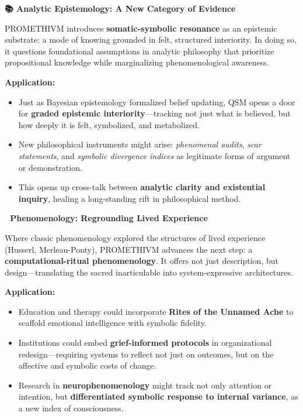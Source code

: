 \textbf{📚 Analytic Epistemology: A New Category of Evidence}

PROMETHIVM introduces \textbf{somatic-symbolic resonance} as an
epistemic substrate: a mode of knowing grounded in felt, structured
interiority. In doing so, it questions foundational assumptions in
analytic philosophy that prioritize propositional knowledge while
marginalizing phenomenological awareness.

\textbf{Application:}

\begin{itemize}
\tightlist
\item
  Just as Bayesian epistemology formalized belief updating, QSM opens a
  door for \textbf{graded epistemic interiority}---tracking not just
  what is believed, but how deeply it is felt, symbolized, and
  metabolized.
\item
  New philosophical instruments might arise: \emph{phenomenal audits},
  \emph{scar statements}, and \emph{symbolic divergence indices} as
  legitimate forms of argument or demonstration.
\item
  This opens up cross-talk between \textbf{analytic clarity and
  existential inquiry}, healing a long-standing rift in philosophical
  method.
\end{itemize}

\textbf{🧠 Phenomenology: Regrounding Lived Experience}

Where classic phenomenology explored the structures of lived experience
(Husserl, Merleau-Ponty), PROMETHIVM advances the next step: a
\textbf{computational-ritual phenomenology}. It offers not just
description, but design---translating the sacred inarticulable into
system-expressive architectures.

\textbf{Application:}

\begin{itemize}
\tightlist
\item
  Education and therapy could incorporate \textbf{Rites of the Unnamed
  Ache} to scaffold emotional intelligence with symbolic fidelity.
\item
  Institutions could embed \textbf{grief-informed protocols} in
  organizational redesign---requiring systems to reflect not just on
  outcomes, but on the affective and symbolic costs of change.
\item
  Research in \textbf{neurophenomenology} might track not only attention
  or intention, but \textbf{differentiated symbolic response to internal
  variance}, as a new index of consciousness.
\end{itemize}

